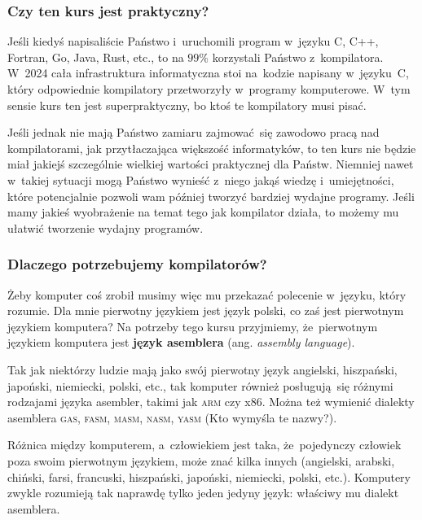 \documentclass[10pt,t]{beamer}
\begin{document}
\begin{frame}
  \frametitle{Czy ten kurs jest praktyczny?}


  Jeśli kiedyś napisaliście Państwo i~uruchomili program w~języku C, C++,
  Fortran, Go, Java, Rust, etc., to na $99\%$ korzystali Państwo
  z~kompilatora. W~2024 cała infrastruktura informatyczna stoi
  na~kodzie napisany w~języku~C, który odpowiednie kompilatory przetworzyły
  w~programy komputerowe. W~tym sensie kurs ten jest superpraktyczny, bo
  ktoś te kompilatory musi pisać.

  Jeśli jednak nie mają Państwo zamiaru zajmować~się zawodowo pracą nad
  kompilatorami, jak przytłaczająca większość informatyków, to ten kurs nie
  będzie miał jakiejś szczególnie wielkiej wartości praktycznej dla Państw.
  Niemniej nawet w~takiej sytuacji mogą Państwo wynieść z~niego jakąś
  wiedzę i~umiejętności, które potencjalnie pozwoli wam później tworzyć
  bardziej wydajne programy. Jeśli mamy jakieś wyobrażenie na temat tego
  jak kompilator działa, to możemy mu ułatwić tworzenie wydajny programów.

\end{frame}





\begin{frame}
  \frametitle{Dlaczego potrzebujemy kompilatorów?}

  \pause


  Żeby komputer coś zrobił musimy więc mu przekazać polecenie w~języku,
  który rozumie. Dla mnie pierwotny językiem jest język polski, co zaś
  jest pierwotnym językiem komputera? Na potrzeby tego kursu przyjmiemy,
  że~pierwotnym językiem komputera jest \textbf{język asemblera}
  (ang. \textit{assembly language}).

  Tak jak niektórzy ludzie mają jako swój pierwotny język angielski,
  hiszpański, japoński, niemiecki, polski, etc., tak komputer również
  posługują~się różnymi rodzajami języka asembler, takimi jak \textsc{arm}
  czy x86. Można też wymienić dialekty asemblera \textsc{gas},
  \textsc{fasm}, \textsc{masm}, \textsc{nasm}, \textsc{yasm} (Kto wymyśla
  te nazwy?).

  Różnica między komputerem, a~człowiekiem jest taka, że~pojedynczy człowiek
  poza swoim pierwotnym językiem, może znać kilka innych (angielski,
  arabski, chiński, farsi, francuski, hiszpański, japoński, niemiecki,
  polski, etc.). Komputery zwykle rozumieją tak naprawdę tylko
  \alert{jeden jedyny} język: właściwy mu dialekt asemblera.

\end{frame}
\end{document}
